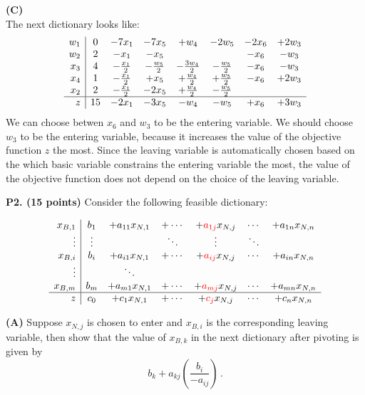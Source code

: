 \documentclass[11pt]{article}
\newcommand\red[1]{\textcolor{red}{#1}}
\begin{document}
\noindent\textbf{(C)}\\
The next dictionary looks like:
\[ \begin{array}{r| c c c c c c c}
w_1 & 0 &- 7x_1 &- 7x_5 &+ w_4 &- 2w_5 &- 2x_6 &+ 2w_3\\
w_2 & 2 & -x_1 & -x_5 & & & -x_6 & -w_3 \\
x_3 & 4 & -\frac{x_1}{2} & -\frac{w_5}{2} & -\frac{3w_4}{2} & -\frac{w_5}{2} & -x_6 & -w_3 \\
x_4 & 1 & -\frac{x_1}{2} & +x_5 & +\frac{w_4}{2} & +\frac{w_5}{2} & -x_6 & +2w_3 \\
x_2 & 2 & -\frac{x_1}{2} & -2x_5 & +\frac{w_4}{2} & -\frac{w_5}{2} && \\
\hline
z & 15 & -2x_1 & -3x_5 & -w_4 & -w_5 & +x_6 & +3w_3 \\
\end{array}\]
We can choose betwen $x_6$ and $w_3$ to be the entering variable.  We should choose $w_3$ to be the entering variable, because it increases the value of the objective function $z$ the most.  Since the leaving variable is automatically chosen based on the which basic variable constrains the entering variable the most, the value of the objective function does not depend on the choice of the leaving variable.

\medskip


\textbf{P2. (15 points)}  Consider the following feasible dictionary:

\[\begin{array}{r|c c c c c c c c}
x_{B,1} & b_1 & + a_{11} x_{N,1} & + \cdots & + \red{a_{1j}} x_{N,j} & \cdots & + a_{1n} x_{N,n}\\
\vdots & \vdots &  & \ddots & \vdots & \ddots  \\
x_{B,i} & b_i & +a_{i1} x_{N,1} & + \cdots & +\red{ a_{ij}} x_{N,j} & \cdots
                                                                & + a_{in} x_{N,n} \\
\vdots & & \ddots & \\ 
x_{B,m} & b_m & + a_{m1} x_{N,1} & + \cdots & +\red{ a_{mj} } x_{N,j} &
                                                                 \cdots  & + a_{mn} x_{N,n} \\
\hline
z & c_0 & + c_1 x_{N,1} & + \cdots & + \red{c_j} x_{N,j} & \cdots & + c_n x_{N,n}\\
\end{array}\]

\noindent \textbf{(A)} Suppose $x_{N,j}$ is chosen to enter and
$x_{B,i}$ is the corresponding leaving variable, then show that the
value of $x_{B,k}$ in the next dictionary after pivoting is given by
\[ b_k + a_{kj} \left(\frac{b_i}{ - a_{ij}}\right)  \,.\]
\end{document}
